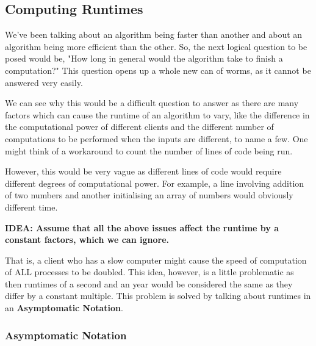\documentclass{article}
\theoremstyle{definition}
\theoremstyle{example}
\begin{document}
\subsection{\Large Computing Runtimes}
\hspace{6mm}We've been talking about an algorithm being faster than another and about an algorithm being more efficient than the other. So, the next logical question to be posed would be, "How long in general would the algorithm take to finish a computation?" This question opens up a whole new can of worms, as it cannot be answered very easily.\par
\vspace{5mm}
We can see why this would be a difficult question to answer as there are many factors which can cause the runtime of an algorithm to vary, like the difference in the computational power of different clients and the different number of computations to be performed when the inputs are different, to name a few. One might think of a workaround to count the number of lines of code being run.\par
\vspace{5mm}

However, this would be very vague as different lines of code would require different degrees of computational power. For example, a line involving addition of two numbers and another initialising an array of numbers would obviously different time.\par
\vspace{2mm}
\begin{center}
    \textbf{IDEA: Assume that all the above issues affect the runtime by a constant factors, which we can ignore.}
\end{center}
\vspace{2mm}
\hspace{6mm}That is, a client who has a slow computer might cause the speed of computation of ALL processes to be doubled. This idea, however, is a little problematic as then runtimes of a second and an year would be considered the same as they differ by a constant multiple. This problem is solved by talking about runtimes in an \textbf{Asymptomatic Notation}.

\subsubsection{\Large Asymptomatic Notation}
\end{document}

